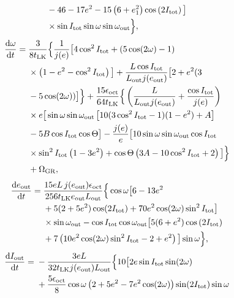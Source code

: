 \documentclass[10pt]{article}%
\newcommand*{\rd}[2]{\frac{\mathrm{d}#1}{\mathrm{d}#2}}
\newcommand*{\p}[1]{\left(#1\right)}
\newcommand*{\s}[1]{\left[#1\right]}
\begin{document}
{\begin{align}
        &- 46 - 17e^2 - 15\p{6 + e_1^2}\cos\p{2I_{\rm tot}}\big]\nonumber\\
        &\times \sin I_{\rm tot} \sin \omega \sin \omega_{\rm out}\Big\},
\end{align}
\begin{align}
    \rd{\omega}{t} ={}& \frac{3}{8t_{\rm LK}}
            \Big\{\frac{1}{j(e)} \big[4 \cos^2 I_{\rm tot}
            + \p{5 \cos (2\omega) - 1}\nonumber\\
        &\times \p{1 - e^2 - \cos^2 I_{\rm tot}}\big] + \frac{L \cos I_{\rm tot}}{
            L_{\rm out}j(e_{\rm out})}\big[2 + e^2(3\nonumber\\
        &- 5\cos(2\omega))\big]\Big\}
        + \frac{15 \epsilon_{\rm oct}}{64t_{\rm LK}}\Big\{
            \p{\frac{L}{L_{\rm out}j(e_{\rm out})}
                + \frac{\cos I_{\rm tot}}{j(e)}}\nonumber\\
        &\times e\big[\sin \omega \sin \omega_{\rm out}
            \s{10(3\cos^2 I_{\rm tot} - 1)(1 - e^2) + A}\nonumber\\
        &- 5B\cos I_{\rm tot}\cos \Theta\big] - \frac{j(e)}{e}
            \big[10 \sin \omega \sin \omega_{\rm out}\cos I_{\rm tot}\nonumber\\
        &\times \sin^2 I_{\rm tot}\p{1 - 3e^2} + \cos \Theta\p{3A -
            10\cos^2 I_{\rm tot} + 2}\big]\Big\}\nonumber\\
        &+ \Omega_{\rm GR},
\end{align}
\begin{align}
    \rd{e_{\rm out}}{t} ={}& \frac{15eL\,j(e_{\rm out})\epsilon_{\rm oct}}{
            256t_{\rm LK}e_{\rm out}L_{\rm out}}\Big\{ \cos \omega
                \big[6 - 13e^2\nonumber\\
        &+ 5(2 + 5e^2)\cos (2I_{\rm tot}) + 70e^2 \cos (2\omega) \sin^2 I_{\rm
            tot}\big]\nonumber\\
        &\times \sin \omega_{\rm out} - \cos I_{\rm tot} \cos \omega_{\rm out}
            \big[5(6 + e^2)\cos \p{2I_{\rm tot}}\nonumber\\
        &+ 7\p{10e^2 \cos (2\omega) \sin^2 I_{\rm tot} - 2 + e^2}\big]
            \sin \omega\Big\},
\end{align}
\begin{align}
    \rd{I_{\rm out}}{t} ={}& -\frac{3eL}{32t_{\rm LK}j(e_{\rm out}) L_{\rm out}}
            \Big\{ 10\big[2e \sin I_{\rm tot} \sin (2\omega)\nonumber\\
        &+ \frac{5\epsilon_{\rm oct}}{8}\cos \omega\p{
            2 + 5e^2 - 7e^2\cos (2\omega)}\sin (2I_{\rm tot})\sin \omega_{\rm
}
\end{align}}
\end{document}
